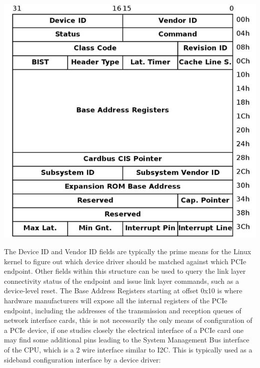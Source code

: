 \documentclass[a4paper,12p,titlepage]{article}
\begin{document}
\includegraphics[width=\textwidth]{pcieconfig}

The Device ID and Vendor ID fields are typically the prime means for the Linux kernel to figure out which device driver should be matched against which PCIe endpoint. Other fields within this structure can be used to query the link layer connectivity status of the endpoint and issue link layer commands, such as a device-level reset. The Base Address Registers starting at offset 0x10 is where hardware manufacturers will expose all the internal registers of the PCIe endpoint, including the addresses of the transmission and reception queues of network interface cards, this is not necessarily the only means of configuration of a PCIe device, if one studies closely the electrical interface of a PCIe card one may find some additional pins leading to the System Management Bus interface of the CPU, which is a 2 wire interface similar to I2C. This is typically used as a sideband configuration interface by a device driver:
\end{document}
